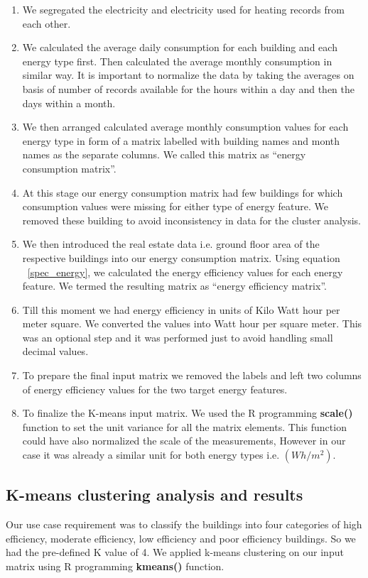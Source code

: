 \begin{enumerate}
\item We segregated the electricity and electricity used for heating records from each other.
\item We calculated the average daily consumption for each building and each energy type first. Then calculated the average monthly consumption in similar way. It is important to normalize the data by taking the averages on basis of number of records available for the hours within a day and then the days within a month. 
\item We then arranged calculated average monthly consumption values for each energy type in form of a matrix labelled with building names and month names as the separate columns. We called this matrix as ``energy consumption matrix''.   
\item At this stage our energy consumption matrix had few buildings for which consumption values were missing for either type of energy feature. We removed these building to avoid inconsistency in data for the cluster analysis. 
\item We then introduced the real estate data i.e. ground floor area of the respective buildings into our energy consumption matrix. Using equation ~\ref{spec_energy}, we calculated the energy efficiency values for each energy feature. We termed the resulting matrix as ``energy efficiency matrix''.
\item Till this moment we had energy efficiency in units of Kilo Watt hour per meter square. We converted the values into Watt hour per square meter. This was an optional step and it was performed just to avoid handling small decimal values.
\item To prepare the final input matrix we removed the labels and left two columns of energy efficiency values for the two target energy features.
\item To finalize the K-means input matrix. We used the R programming \textbf{scale()} function to set the unit variance for all the matrix elements. This function could have also normalized the scale of the measurements, However in our case it was already a similar unit for both energy types i.e. \((Wh/m^2)\).        
\end{enumerate}
\subsection{K-means clustering analysis and results}
Our use case requirement was to classify the buildings into four categories of high efficiency, moderate efficiency, low efficiency and poor efficiency buildings. So we had the pre-defined K value of 4. We applied k-means clustering on our input matrix using R programming \textbf{kmeans()} function.

